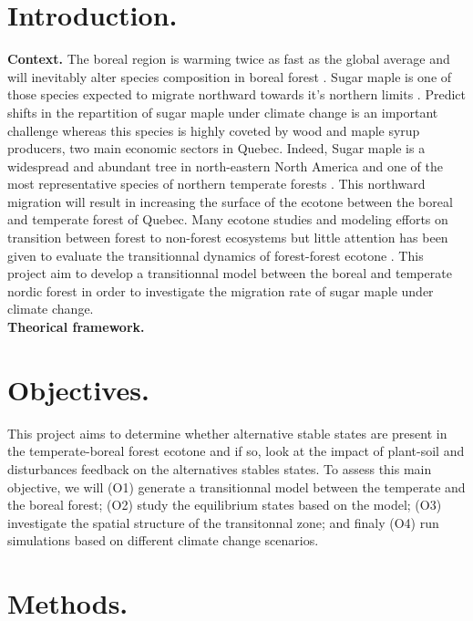 




\newpage
\setcounter{page}{1}

\section{Introduction.}

\textbf{Context.} The boreal region is warming twice as fast as the global average and will inevitably alter species composition in boreal forest \cite{Scheffer2012,Hughes2000}.  Sugar maple is one of those species expected to migrate northward towards it's northern limits \cite{McKENNEY2007,Goldblum2005}. Predict shifts in the repartition of sugar maple under climate change is an important challenge whereas this species is highly coveted by wood and maple syrup producers, two main economic sectors in Quebec. Indeed, Sugar maple is a widespread and abundant tree in north-eastern North America and one of the most representative species of northern temperate forests \cite{Graignic2013,Messaoud2007,Kellman2004}. This northward migration will result in increasing the surface of the ecotone between the boreal and temperate forest of Quebec. Many ecotone studies and modeling efforts on transition between forest to non-forest ecosystems \cite{Scheffer2012,Scheffer2001,Hirota2011} but little attention has been given to evaluate the transitionnal dynamics of forest-forest ecotone \cite{Goldblum2010,Graignic2013}. This project aim to develop a transitionnal model between the boreal and temperate nordic forest in order to investigate the migration rate of sugar maple under climate change. \\

\textbf{Theorical framework.}   %


\section{Objectives.}

 This project aims to determine whether alternative stable states are present in the temperate-boreal forest ecotone and if so, look at the impact of plant-soil and disturbances feedback on the alternatives stables states. To assess this main objective, we will (O1) generate a transitionnal model between the temperate and the boreal forest; (O2) study the equilibrium states based on the model; (O3) investigate the spatial structure of the transitonnal zone; and finaly (O4) run simulations based on different climate change scenarios. \\

\section{Methods.}


\newpage


